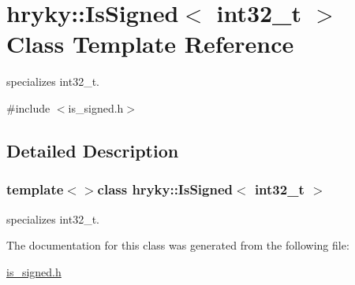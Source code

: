 \hypertarget{classhryky_1_1_is_signed_3_01int32__t_01_4}{\section{hryky\-:\-:Is\-Signed$<$ int32\-\_\-t $>$ Class Template Reference}
\label{classhryky_1_1_is_signed_3_01int32__t_01_4}
}


specializes int32\-\_\-t.  




{\ttfamily \#include $<$is\-\_\-signed.\-h$>$}



\subsection{Detailed Description}
\subsubsection*{template$<$$>$class hryky\-::\-Is\-Signed$<$ int32\-\_\-t $>$}

specializes int32\-\_\-t. 

The documentation for this class was generated from the following file\-:\begin{DoxyCompactItemize}
\item 
\hyperlink{is__signed_8h}{is\-\_\-signed.\-h}\end{DoxyCompactItemize}
